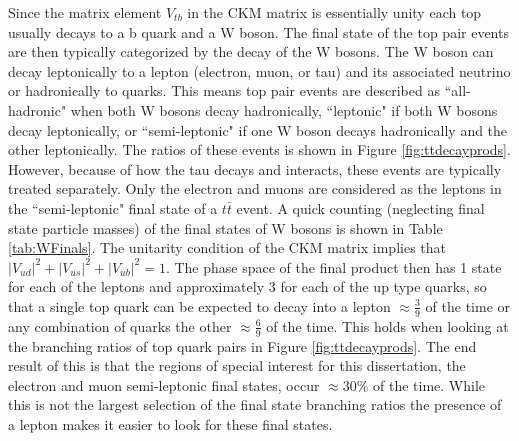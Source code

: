 Since the matrix element $V_{tb}$ in the CKM matrix is essentially unity each top usually decays to a b quark and a W boson.  The final state of the top pair events are then typically categorized by the decay of the W bosons.  The W boson can decay leptonically to a lepton (electron, muon, or tau) and its associated neutrino or hadronically to quarks.  This means top pair events are described as ``all-hadronic" when both W bosons decay hadronically, ``leptonic" if both W bosons decay leptonically, or ``semi-leptonic" if one W boson decays hadronically and the other leptonically.  The ratios of these events is shown in Figure \ref{fig:ttdecayprods}.  However, because of how the tau decays and interacts, these events are typically treated separately.  Only the electron and muons are considered as the leptons in the ``semi-leptonic" final state of a $t\bar{t}$ event.  A quick counting (neglecting final state particle masses) of the final states of W bosons  is shown in Table \ref{tab:WFinals}.  The unitarity condition of the CKM matrix implies that $|V_{ud}|^2 + |V_{us}|^2 + |V_{ub}|^2 =1$.  The phase space of the final product then has 1 state for each of the leptons and approximately 3 for each of the up type quarks, so that a single top quark can be expected to decay into a lepton $\approx \frac{3}{9}$ of the time or any combination of quarks the other $\approx \frac{6}{9}$ of the time.  This holds when looking at the branching ratios of top quark pairs in Figure \ref{fig:ttdecayprods}.  The end result of this is that the regions of special interest for this dissertation, the electron and muon semi-leptonic final states, occur $\approx 30\%$ of the time.  While this is not the largest selection of the final state branching ratios the presence of a lepton makes it easier to look for these final states.

